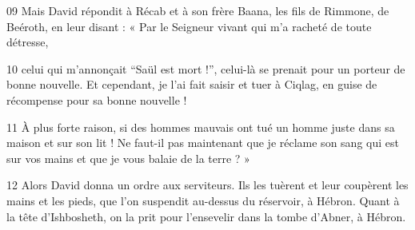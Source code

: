 
09 Mais David répondit à Récab et à son frère Baana, les fils de Rimmone, de Beéroth, en leur disant : « Par le Seigneur vivant qui m’a racheté de toute détresse,

10 celui qui m’annonçait “Saül est mort !”, celui-là se prenait pour un porteur de bonne nouvelle. Et cependant, je l’ai fait saisir et tuer à Ciqlag, en guise de récompense pour sa bonne nouvelle !

11 À plus forte raison, si des hommes mauvais ont tué un homme juste dans sa maison et sur son lit ! Ne faut-il pas maintenant que je réclame son sang qui est sur vos mains et que je vous balaie de la terre ? »

12 Alors David donna un ordre aux serviteurs. Ils les tuèrent et leur coupèrent les mains et les pieds, que l’on suspendit au-dessus du réservoir, à Hébron. Quant à la tête d’Ishbosheth, on la prit pour l’ensevelir dans la tombe d’Abner, à Hébron.